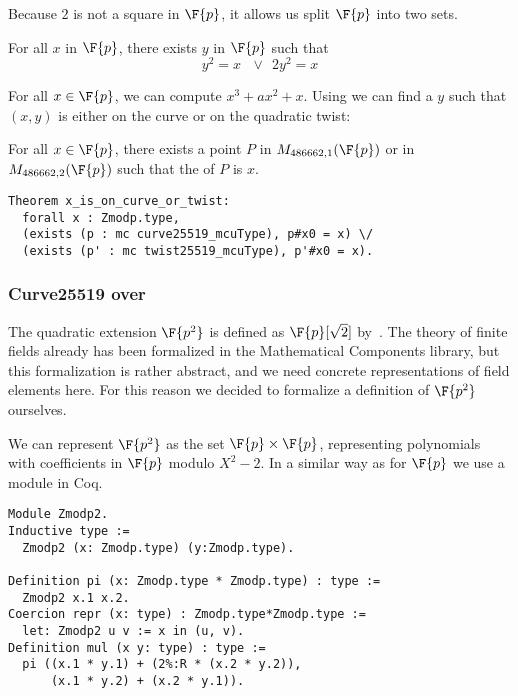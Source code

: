 Because $2$ is not a square in $\F{p}$, it allows us split $\F{p}$ into two sets.
\begin{lemma}
  \label{lemma:square-or-2square}
  For all $x$ in $\F{p}$, there exists $y$ in $\F{p}$ such that
  $$y^2 = x\ \ \ \lor\ \ 2y^2 = x$$
\end{lemma}
For all $x \in \F{p}$, we can compute $x^3 + ax^2 + x$. Using 
we can find a $y$ such that $(x,y)$ is either on the curve or on the quadratic twist:
\begin{lemma}
  \label{lemma:curve-or-twist}
  For all $x \in \F{p}$, there exists a point $P$ in $M_{486662,1}(\F{p})$ or
  in $M_{486662,2}(\F{p})$ such that the \xcoord of $P$ is $x$.
\end{lemma}
\begin{lstlisting}[language=Coq,belowskip=-0.5 \baselineskip]
Theorem x_is_on_curve_or_twist:
  forall x : Zmodp.type,
  (exists (p : mc curve25519_mcuType), p#x0 = x) \/
  (exists (p' : mc twist25519_mcuType), p'#x0 = x).
\end{lstlisting}

\subsubsection{Curve25519 over }
\label{subsec:curvep2}

The quadratic extension $\F{p^2}$ is defined as $\F{p}[\sqrt{2}]$ by~\cite{Ber06}.
The theory of finite fields already has been formalized in the Mathematical Components
library,
but this formalization is rather abstract, and we need concrete representations of field
elements here.
For this reason we decided to formalize a definition of $\F{p^2}$ ourselves.

We can represent $\F{p^2}$ as the set $\F{p} \times \F{p}$,
representing polynomials with coefficients in $\F{p}$ modulo $X^2 - 2$. In a similar way
as for $\F{p}$ we use a module in Coq.
\begin{lstlisting}[language=Coq,belowskip=-0.25 \baselineskip]
Module Zmodp2.
Inductive type :=
  Zmodp2 (x: Zmodp.type) (y:Zmodp.type).

Definition pi (x: Zmodp.type * Zmodp.type) : type :=
  Zmodp2 x.1 x.2.
Coercion repr (x: type) : Zmodp.type*Zmodp.type :=
  let: Zmodp2 u v := x in (u, v).
Definition mul (x y: type) : type :=
  pi ((x.1 * y.1) + (2%:R * (x.2 * y.2)),
      (x.1 * y.2) + (x.2 * y.1)).
\end{lstlisting}

